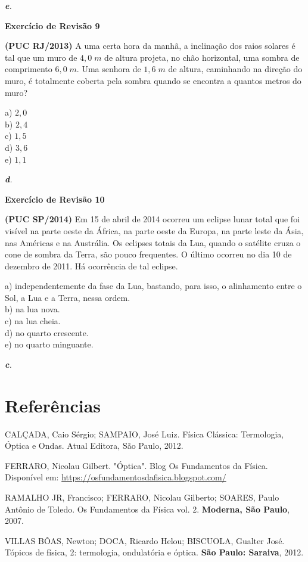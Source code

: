 \documentclass[11pt,twocolumn,oneside]{article}
\newenvironment{resposta*}
  {\bf Resposta:\\ }
  {}
\begin{document}
\begin{resposta*}
{\it \textbf{e}.}
\end{resposta*}

\textbf{Exercício de Revisão 9}


\textbf{(PUC RJ/2013)} A uma certa hora da manhã, a inclinação dos raios solares é tal que um muro de $4,0\;m$ de altura projeta, no chão horizontal, uma sombra de comprimento $6,0\;m$. Uma senhora de $1,6\;m$ de altura, caminhando na direção do muro, é totalmente coberta pela sombra quando se encontra a quantos metros do muro?


a)	$2,0$ \\
b)	$2,4$ \\
c)	$1,5$ \\
d)	$3,6$ \\
e)	$1,1$ \\


\begin{resposta*}
{\it \textbf{d}.}
\end{resposta*}

\textbf{Exercício de Revisão 10}


\textbf{(PUC SP/2014)} Em 15 de abril de 2014 ocorreu um eclipse lunar total que foi visível na parte oeste da África, na parte oeste da Europa, na parte leste da Ásia, nas Américas e na Austrália. Os eclipses totais da Lua, quando o satélite cruza o cone de sombra da Terra, são pouco frequentes. O último ocorreu no dia 10 de dezembro de 2011. Há ocorrência de tal eclipse.


a)	independentemente da fase da Lua, bastando, para isso, o alinhamento entre o Sol, a Lua e a Terra, nessa ordem. \\
b)	na lua nova. \\
c)	na lua cheia. \\
d)	no quarto crescente. \\
e)	no quarto minguante. \\


\begin{resposta*}
{\it \textbf{c}.}
\end{resposta*}

\hypertarget{x-referências}{\section{Referências}}
CALÇADA, Caio Sérgio; SAMPAIO, José Luiz. Física Clássica: Termologia, Óptica e Ondas. Atual Editora, São Paulo, 2012.


FERRARO, Nicolau Gilbert. "Óptica". Blog Os Fundamentos da Física. Disponível em: \href{https://osfundamentosdafisica.blogspot.com/}{https://osfundamentosdafisica.blogspot.com/}


RAMALHO JR, Francisco; FERRARO, Nicolau Gilberto; SOARES, Paulo Antônio de Toledo. Os Fundamentos da Física vol. 2. \textbf{Moderna, São Paulo}, 2007.


VILLAS BÔAS, Newton; DOCA, Ricardo Helou; BISCUOLA, Gualter José. Tópicos de física, 2: termologia, ondulatória e óptica. \textbf{São Paulo: Saraiva}, 2012.
\end{document}
